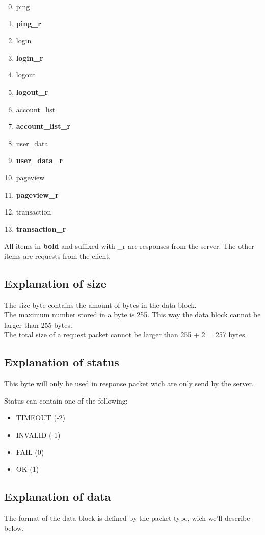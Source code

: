 \documentclass[12pt]{article}
\begin{document}
\begin{enumerate}
	\setcounter{enumi}{-1}
	\item ping
	\item \textbf{ping\_r}
	\item login
	\item \textbf{login\_r}
	\item logout
	\item \textbf{logout\_r}
	\item account\_list
	\item \textbf{account\_list\_r}
	\item user\_data
	\item \textbf{user\_data\_r}
	\item pageview
	\item \textbf{pageview\_r}
	\item transaction
	\item \textbf{transaction\_r}
\end{enumerate}

All items in \textbf{bold} and suffixed with \_r are responses from the server.
The other items are requests from the client.

\subsection{Explanation of size} \label{hfst:size}
The size byte contains the amount of bytes in the data block.\\
The maximum number stored in a byte is 255. This way the data block
cannot be larger than 255 bytes.\\ The total size of a request
packet cannot be larger than 255 + 2 = 257 bytes.

\subsection{Explanation of status} \label{hfst:status}
This byte will only be used in response packet wich are only send by the server.

Status can contain one of the following:
\begin{itemize}
	\item TIMEOUT (-2)
	\item INVALID (-1)
	\item FAIL (0)
	\item OK (1)
\end{itemize}

\subsection{Explanation of data} \label{hfst:data}
The format of the data block is defined by the packet type, wich we'll describe below.
\end{document}
